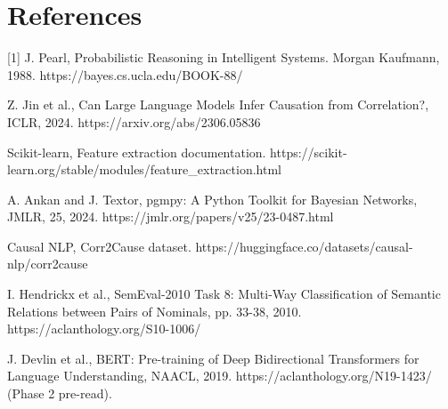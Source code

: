 \documentclass[conference]{IEEEtran}
\begin{document}
\section*{References}
[1] J. Pearl, Probabilistic Reasoning in Intelligent Systems. Morgan Kaufmann, 1988. https://bayes.cs.ucla.edu/BOOK-88/
\par
[2] Z. Jin et al., Can Large Language Models Infer Causation from Correlation?, ICLR, 2024. https://arxiv.org/abs/2306.05836
\par
[3] Scikit-learn, Feature extraction documentation. https://scikit-learn.org/stable/modules/feature\_extraction.html
\par
[4] A. Ankan and J. Textor, pgmpy: A Python Toolkit for Bayesian Networks, JMLR, 25, 2024. https://jmlr.org/papers/v25/23-0487.html
\par
[5] Causal NLP, Corr2Cause dataset. https://huggingface.co/datasets/causal-nlp/corr2cause
\par
[6] I. Hendrickx et al., SemEval-2010 Task 8: Multi-Way Classification of Semantic Relations between Pairs of Nominals, pp. 33-38, 2010. https://aclanthology.org/S10-1006/
\par
[7] J. Devlin et al., BERT: Pre-training of Deep Bidirectional Transformers for Language Understanding, NAACL, 2019. https://aclanthology.org/N19-1423/ (Phase 2 pre-read).
\end{document}
